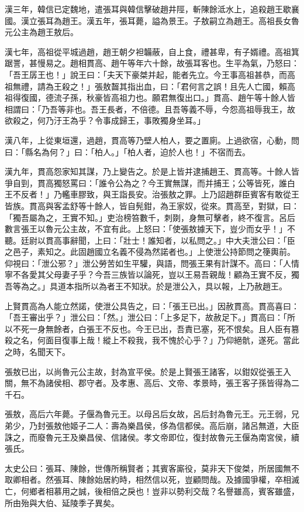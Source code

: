 \begin{pinyinscope}
漢三年，韓信已定魏地，遣張耳與韓信擊破趙井陘，斬陳餘泜水上，追殺趙王歇襄國。漢立張耳為趙王。漢五年，張耳薨，謚為景王。子敖嗣立為趙王。高祖長女魯元公主為趙王敖后。

漢七年，高祖從平城過趙，趙王朝夕袒韛蔽，自上食，禮甚卑，有子婿禮。高祖箕踞詈，甚慢易之。趙相貫高、趙午等年六十餘，故張耳客也。生平為氣，乃怒曰：「吾王孱王也！」說王曰：「夫天下豪桀并起，能者先立。今王事高祖甚恭，而高祖無禮，請為王殺之！」張敖齧其指出血，曰：「君何言之誤！且先人亡國，賴高祖得復國，德流子孫，秋豪皆高祖力也。願君無復出口。」貫高、趙午等十餘人皆相謂曰：「乃吾等非也。吾王長者，不倍德。且吾等義不辱，今怨高祖辱我王，故欲殺之，何乃汙王為乎？令事成歸王，事敗獨身坐耳。」

漢八年，上從東垣還，過趙，貫高等乃壁人柏人，要之置廁。上過欲宿，心動，問曰：「縣名為何？」曰：「柏人。」「柏人者，迫於人也！」不宿而去。

漢九年，貫高怨家知其謀，乃上變告之。於是上皆并逮捕趙王、貫高等。十餘人皆爭自剄，貫高獨怒罵曰：「誰令公為之？今王實無謀，而并捕王；公等皆死，誰白王不反者！」乃轞車膠致，與王詣長安。治張敖之罪。上乃詔趙群臣賓客有敢從王皆族。貫高與客孟舒等十餘人，皆自髡鉗，為王家奴，從來。貫高至，對獄，曰：「獨吾屬為之，王實不知。」吏治榜笞數千，刺剟，身無可擊者，終不復言。呂后數言張王以魯元公主故，不宜有此。上怒曰：「使張敖據天下，豈少而女乎！」不聽。廷尉以貫高事辭聞，上曰：「壯士！誰知者，以私問之。」中大夫泄公曰：「臣之邑子，素知之。此固趙國立名義不侵為然諾者也。」上使泄公持節問之箯輿前。仰視曰：「泄公邪？」泄公勞苦如生平驩，與語，問張王果有計謀不。高曰：「人情寧不各愛其父母妻子乎？今吾三族皆以論死，豈以王易吾親哉！顧為王實不反，獨吾等為之。」具道本指所以為者王不知狀。於是泄公入，具以報，上乃赦趙王。

上賢貫高為人能立然諾，使泄公具告之，曰：「張王已出。」因赦貫高。貫高喜曰：「吾王審出乎？」泄公曰：「然。」泄公曰：「上多足下，故赦足下。」貫高曰：「所以不死一身無餘者，白張王不反也。今王已出，吾責已塞，死不恨矣。且人臣有篡殺之名，何面目復事上哉！縱上不殺我，我不愧於心乎？」乃仰絕骯，遂死。當此之時，名聞天下。

張敖已出，以尚魯元公主故，封為宣平侯。於是上賢張王諸客，以鉗奴從張王入關，無不為諸侯相、郡守者。及孝惠、高后、文帝、孝景時，張王客子孫皆得為二千石。

張敖，高后六年薨。子偃為魯元王。以母呂后女故，呂后封為魯元王。元王弱，兄弟少，乃封張敖他姬子二人：壽為樂昌侯，侈為信都侯。高后崩，諸呂無道，大臣誅之，而廢魯元王及樂昌侯、信諸侯。孝文帝即位，復封故魯元王偃為南宮侯，續張氏。

太史公曰：張耳、陳餘，世傳所稱賢者；其賓客廝役，莫非天下俊桀，所居國無不取卿相者。然張耳、陳餘始居約時，相然信以死，豈顧問哉。及據國爭權，卒相滅亡，何鄉者相慕用之誠，後相倍之戾也！豈非以勢利交哉？名譽雖高，賓客雖盛，所由殆與大伯、延陵季子異矣。


\end{pinyinscope}